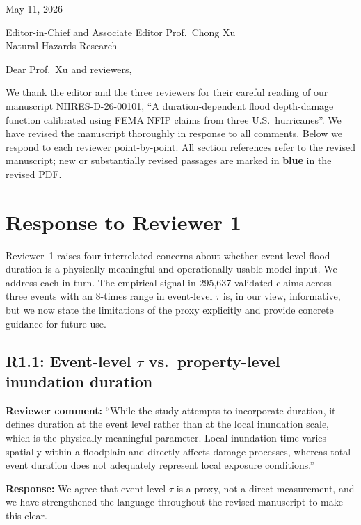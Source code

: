 \documentclass[11pt]{article}
\begin{document}
\noindent May 11, 2026

\noindent Editor-in-Chief and Associate Editor Prof.~Chong Xu \\
Natural Hazards Research

\bigskip

\noindent Dear Prof.~Xu and reviewers,

\medskip

We thank the editor and the three reviewers for their careful reading of our manuscript NHRES-D-26-00101, ``A duration-dependent flood depth-damage function calibrated using FEMA NFIP claims from three U.S.\ hurricanes''. We have revised the manuscript thoroughly in response to all comments. Below we respond to each reviewer point-by-point. All section references refer to the revised manuscript; new or substantially revised passages are marked in \textbf{blue} in the revised PDF.

\section*{Response to Reviewer 1}

Reviewer~1 raises four interrelated concerns about whether event-level flood duration is a physically meaningful and operationally usable model input. We address each in turn. The empirical signal in 295,637 validated claims across three events with an 8-times range in event-level $\tau$ is, in our view, informative, but we now state the limitations of the proxy explicitly and provide concrete guidance for future use.

\subsection*{R1.1: Event-level $\tau$ vs.\ property-level inundation duration}

\textbf{Reviewer comment:} ``While the study attempts to incorporate duration, it defines duration at the event level rather than at the local inundation scale, which is the physically meaningful parameter. Local inundation time varies spatially within a floodplain and directly affects damage processes, whereas total event duration does not adequately represent local exposure conditions.''

\textbf{Response:} We agree that event-level $\tau$ is a proxy, not a direct measurement, and we have strengthened the language throughout the revised manuscript to make this clear.
\end{document}
